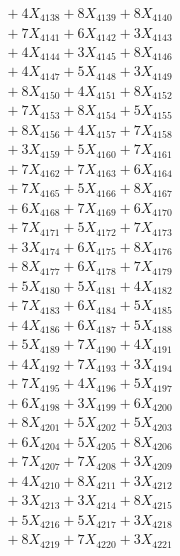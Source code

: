 \documentclass[a4paper,10pt]{article}
\begin{document}
{\begin{align}
&\;  + 4 X_{4138} + 8 X_{4139} + 8 X_{4140} \\[0.3ex]
&\;  + 7 X_{4141} + 6 X_{4142} + 3 X_{4143} \\[0.3ex]
&\;  + 4 X_{4144} + 3 X_{4145} + 8 X_{4146} \\[0.3ex]
&\;  + 4 X_{4147} + 5 X_{4148} + 3 X_{4149} \\[0.5ex]\allowbreak
&\;  + 8 X_{4150} + 4 X_{4151} + 8 X_{4152} \\[0.3ex]
&\;  + 7 X_{4153} + 8 X_{4154} + 5 X_{4155} \\[0.3ex]
&\;  + 8 X_{4156} + 4 X_{4157} + 7 X_{4158} \\[0.3ex]
&\;  + 3 X_{4159} + 5 X_{4160} + 7 X_{4161} \\[0.3ex]
&\;  + 7 X_{4162} + 7 X_{4163} + 6 X_{4164} \\[0.3ex]
&\;  + 7 X_{4165} + 5 X_{4166} + 8 X_{4167} \\[0.3ex]
&\;  + 6 X_{4168} + 7 X_{4169} + 6 X_{4170} \\[0.3ex]
&\;  + 7 X_{4171} + 5 X_{4172} + 7 X_{4173} \\[0.3ex]
&\;  + 3 X_{4174} + 6 X_{4175} + 8 X_{4176} \\[0.3ex]
&\;  + 8 X_{4177} + 6 X_{4178} + 7 X_{4179} \\[0.5ex]\allowbreak
&\;  + 5 X_{4180} + 5 X_{4181} + 4 X_{4182} \\[0.3ex]
&\;  + 7 X_{4183} + 6 X_{4184} + 5 X_{4185} \\[0.3ex]
&\;  + 4 X_{4186} + 6 X_{4187} + 5 X_{4188} \\[0.3ex]
&\;  + 5 X_{4189} + 7 X_{4190} + 4 X_{4191} \\[0.3ex]
&\;  + 4 X_{4192} + 7 X_{4193} + 3 X_{4194} \\[0.3ex]
&\;  + 7 X_{4195} + 4 X_{4196} + 5 X_{4197} \\[0.3ex]
&\;  + 6 X_{4198} + 3 X_{4199} + 6 X_{4200} \\[0.3ex]
&\;  + 8 X_{4201} + 5 X_{4202} + 5 X_{4203} \\[0.3ex]
&\;  + 6 X_{4204} + 5 X_{4205} + 8 X_{4206} \\[0.3ex]
&\;  + 7 X_{4207} + 7 X_{4208} + 3 X_{4209} \\[0.5ex]\allowbreak
&\;  + 4 X_{4210} + 8 X_{4211} + 3 X_{4212} \\[0.3ex]
&\;  + 3 X_{4213} + 3 X_{4214} + 8 X_{4215} \\[0.3ex]
&\;  + 5 X_{4216} + 5 X_{4217} + 3 X_{4218} \\[0.3ex]
&\;  + 8 X_{4219} + 7 X_{4220} + 3 X_{4221} \\[0.3ex]

\end{align}}
\end{document}
